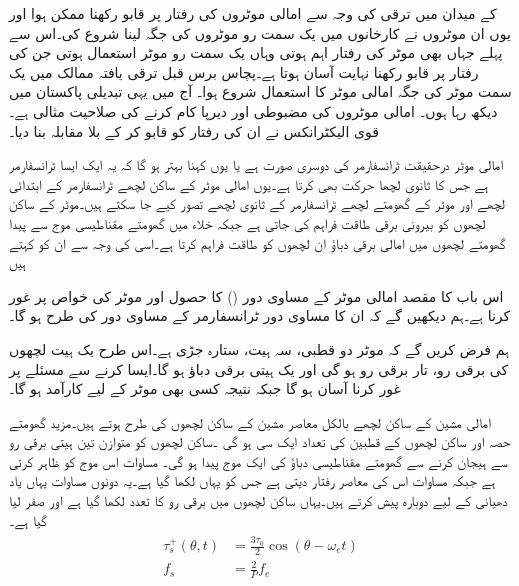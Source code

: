  کے میدان میں ترقی کی وجہ سے  امالی موٹروں کی رفتار پر قابو رکھنا ممکن ہوا اور یوں ان موٹروں نے کارخانوں میں یک سمت  رو موٹروں کی جگہ لینا شروع کی۔اس سے پہلے جہاں بھی موٹر کی رفتار اہم  ہوتی وہاں یک سمت  رو موٹر  استعمال ہوتی جن کی رفتار پر قابو رکھنا نہایت آسان ہوتا ہے۔پچاس  برس  قبل ترقی یافتہ ممالک میں یک سمت موٹر  کی جگہ  امالی موٹر کا استعمال شروع ہوا۔ آج میں یہی تبدیلی پاکستان میں دیکھ رہا ہوں۔ امالی موٹروں کی مضبوطی اور دیرپا کام کرنے کی صلاحیت مثالی ہے۔ قوی الیکٹرانکس نے ان کی رفتار کو قابو کر کے  بلا مقابلہ بنا دیا۔

امالی موٹر درحقیقت  ٹرانسفارمر کی دوسری صورت ہے یا یوں کہنا بہتر ہو گا کہ یہ ایک ایسا ٹرانسفارمر ہے جس کا ثانوی لچھا حرکت بھی کرتا ہے۔یوں امالی موٹر کے ساکن لچھے ٹرانسفارمر کے ابتدائی لچھے اور موٹر کے گھومتے لچھے ٹرانسفارمر کے ثانوی لچھے تصور کیے جا سکتے ہیں۔موٹر کے ساکن لچھوں کو بیرونی برقی طاقت فراہم کی جاتی ہے جبکہ  خلاء میں گھومتے مقناطیسی موج سے پیدا گھومتے لچھوں میں امالی برقی دباؤ  ان لچھوں کو طاقت فراہم کرتا ہے۔اسی کی  وجہ سے ان کو  کہتے ہیں

 اس باب کا مقصد امالی موٹر کے مساوی دور  ()  کا حصول اور موٹر کی خواص پر غور کرنا ہے۔ہم دیکھیں گے کہ ان کا مساوی دور ٹرانسفارمر کے مساوی دور کی طرح  ہو گا۔

ہم فرض کریں گے کہ موٹر دو قطبی، سہ ہیت،  ستارہ  جڑی ہے۔اس طرح یک ہیت لچھوں کی  برقی رو، تار برقی رو ہو گی اور  یک ہیتی برقی دباؤ
  ہو گا۔ایسا کرنے سے مسئلے پر غور کرنا آسان ہو گا جبکہ نتیجہ کسی بھی موٹر کے لیے کارآمد ہو گا۔

امالی مشین کے ساکن لچھے بالکل معاصر مشین کے ساکن لچھوں کی طرح ہوتے ہیں۔مزید  گھومتے حصہ اور ساکن لچھوں کے قطبین کی تعداد ایک سی ہو گی ۔ساکن لچھوں کو متوازن تین ہیتی برقی رو سے ہیجان  کرنے سے گھومتے مقناطیسی دباؤ کی ایک  موج پیدا ہو گی۔ مساوات   اس موج کو ظاہر کرتی ہے جبکہ مساوات   اس کی معاصر رفتار  دیتی ہے جس کو یہاں  لکھا گیا ہے۔یہ دونوں مساوات یہاں یاد دھیانی کے لیے دوبارہ پیش کرتے  ہیں۔یہاں ساکن لچھوں میں برقی رو کا تعدد  لکھا گیا ہے اور   صفر لیا گیا ہے۔
\begin{gather}
\begin{aligned}\label{مساوات_امالی_گھومتا_مقناطیسی_دباو_الف}
\tau_s^+ (\theta,t)&=\frac{3 \tau_0}{2} \cos (\theta-\omega_ e t)\\
f_s&=\frac{2}{P} f_e
\end{aligned}
\end{gather}


